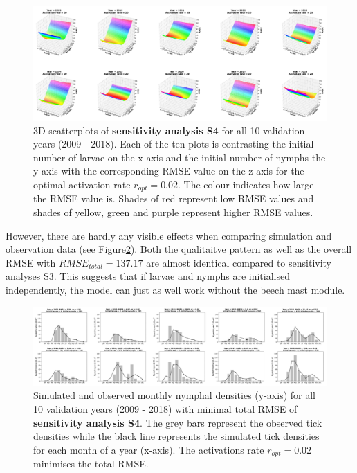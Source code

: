 \documentclass[a4paper, 11pt]{scrartcl}
\begin{document}
\begin{figure}[h!]
\centering
\includegraphics[width=\linewidth]{figures/independent_initial_ticks_without_beech_error}
\caption{3D scatterplots of \textbf{sensitivity analysis S4} for all 10 validation years (2009 - 2018). Each of the ten plots is contrasting the initial number of larvae on the
x-axis and the initial number of nymphs the y-axis with the corresponding RMSE value on the z-axis for the optimal activation rate $r_{opt} = 0.02$. The colour indicates how large
the RMSE value is. Shades of red represent low RMSE values and shades of yellow, green and purple represent higher RMSE values.}
\label{fig:independent_initial_ticks_without_beech_error}
\end{figure}

However, there are hardly any visible effects when comparing simulation and observation data (see Figure\ref{fig:independent_initial_ticks_without_beech}). Both the qualitaitve
pattern as well as the overall RMSE with $RMSE_{total} = 137.17$ are almost identical compared to sensitivity analyses S3. This suggests that if larvae and nymphs are
initialised independently, the model can just as well work without the beech mast module.


\begin{figure}[h!]
\centering
\includegraphics[width=\linewidth]{figures/independent_initial_ticks_without_beech}
\caption{Simulated and observed monthly nymphal densities (y-axis) for all 10 validation years (2009 - 2018) with minimal total RMSE of \textbf{sensitivity analysis S4}. The
grey bars represent the observed tick densities while the black line represents the simulated tick densities for each month of a year (x-axis). The activations rate
$r_{opt}= 0.02$ minimises the total RMSE.}
\label{fig:independent_initial_ticks_without_beech}
\end{figure}
\end{document}
